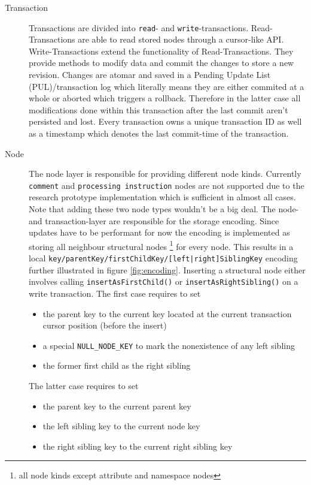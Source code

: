 \begin{description}
\item[Transaction] Transactions are divided into \texttt{read}- and \texttt{write}-transactions. Read-Transactions are able to read stored nodes through a cursor-like API. Write-Transactions extend the functionality of Read-Transactions. They provide methods to modify data and commit the changes to store a new revision. Changes are atomar and saved in a Pending Update List (PUL)/transaction log which literally means they are either commited at a whole or aborted which triggers a rollback. Therefore in the latter case all modifications done within this transaction after the last commit aren't persisted and lost. Every transaction owns a unique transaction ID as well as a timestamp which denotes the last commit-time of the transaction.
\item[Node] The node layer is responsible for providing different node kinds. Currently \texttt{comment} and \texttt{processing instruction} nodes are not supported due to the  research prototype implementation which is sufficient in almost all cases. Note that adding these two node types wouldn't be a big deal. The node- and transaction-layer are responsible for the storage encoding. Since updates have to be performant for now the encoding is implemented as storing all neighbour structural nodes \footnote{all node kinds except attribute and namespace nodes} for every node. This results in a local \texttt{key/parentKey/firstChildKey/[left|right]SiblingKey} encoding further illustrated in figure \ref{fig:encoding}. Inserting a structural node either involves calling \texttt{insertAsFirstChild()} or \texttt{insertAsRightSibling()} on a write transaction. The first case requires to set

\begin{itemize}
\item the parent key to the current key located at the current transaction cursor position (before the insert)
\item a special \texttt{NULL\_NODE\_KEY} to mark the nonexistence of any left sibling
\item the former first child as the right sibling
\end{itemize}

The latter case requires to set

\begin{itemize}
\item the parent key to the current parent key
\item the left sibling key to the current node key
\item the right sibling key to the current right sibling key
\end{itemize}


\end{description}
